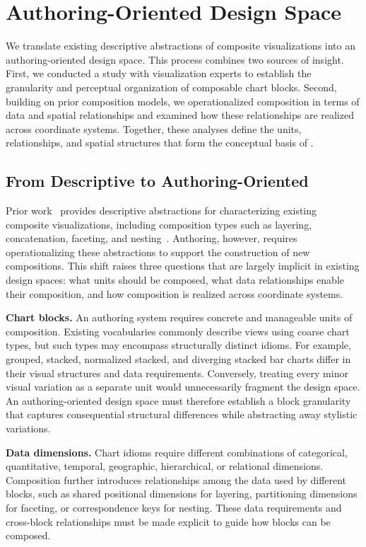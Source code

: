 \section{Authoring-Oriented Design Space}

We translate existing descriptive abstractions of composite visualizations
into an authoring-oriented design space. This process combines two sources of
insight. First, we conducted a study with visualization experts to establish
the granularity and perceptual organization of composable chart blocks.
Second, building on prior composition models, we operationalized composition
in terms of data and spatial relationships and examined how these
relationships are realized across coordinate systems. Together, these
analyses define the units, relationships, and spatial structures that form the
conceptual basis of {\system}.

\subsection{From Descriptive to Authoring-Oriented}

Prior work~\cite{javed2012exploring,Composite,vaid} provides descriptive
abstractions for characterizing existing composite visualizations, including
composition types such as layering, concatenation, faceting, and
nesting~\cite{vaid}. Authoring, however, requires operationalizing these
abstractions to support the construction of new compositions. This shift
raises three questions that are largely implicit in existing design spaces:
what units should be composed, what data relationships enable their
composition, and how composition is realized across coordinate systems.

\textbf{Chart blocks.}
An authoring system requires concrete and manageable units of composition.
Existing vocabularies commonly describe views using coarse chart types, but
such types may encompass structurally distinct idioms. For example, grouped,
stacked, normalized stacked, and diverging stacked bar charts differ in their
visual structures and data requirements. Conversely, treating every minor
visual variation as a separate unit would unnecessarily fragment the design
space. An authoring-oriented design space must therefore establish a block
granularity that captures consequential structural differences while
abstracting away stylistic variations.

\textbf{Data dimensions.}
Chart idioms require different combinations of categorical, quantitative,
temporal, geographic, hierarchical, or relational dimensions. Composition
further introduces relationships among the data used by different blocks,
such as shared positional dimensions for layering, partitioning dimensions
for faceting, or correspondence keys for nesting. These data requirements and
cross-block relationships must be made explicit to guide how blocks can be composed.

